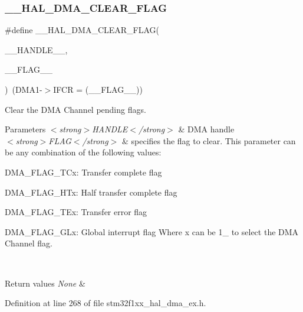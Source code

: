 \subsubsection{\texorpdfstring{\+\_\+\+\_\+\+H\+A\+L\+\_\+\+D\+M\+A\+\_\+\+C\+L\+E\+A\+R\+\_\+\+F\+L\+AG}{\_\_HAL\_DMA\_CLEAR\_FLAG}}
{\footnotesize\ttfamily \#define \+\_\+\+\_\+\+H\+A\+L\+\_\+\+D\+M\+A\+\_\+\+C\+L\+E\+A\+R\+\_\+\+F\+L\+AG(\begin{DoxyParamCaption}\item[{}]{\+\_\+\+\_\+\+H\+A\+N\+D\+L\+E\+\_\+\+\_\+,  }\item[{}]{\+\_\+\+\_\+\+F\+L\+A\+G\+\_\+\+\_\+ }\end{DoxyParamCaption})~(D\+M\+A1-\/$>$I\+F\+CR = (\+\_\+\+\_\+\+F\+L\+A\+G\+\_\+\+\_\+))}



Clear the D\+MA Channel pending flags. 


\begin{DoxyParams}{Parameters}
{\em $<$strong$>$\+H\+A\+N\+D\+L\+E$<$/strong$>$} & D\+MA handle \\
\hline
{\em $<$strong$>$\+F\+L\+A\+G$<$/strong$>$} & specifies the flag to clear. This parameter can be any combination of the following values\+: \begin{DoxyItemize}
\item D\+M\+A\+\_\+\+F\+L\+A\+G\+\_\+\+T\+Cx\+: Transfer complete flag \item D\+M\+A\+\_\+\+F\+L\+A\+G\+\_\+\+H\+Tx\+: Half transfer complete flag \item D\+M\+A\+\_\+\+F\+L\+A\+G\+\_\+\+T\+Ex\+: Transfer error flag \item D\+M\+A\+\_\+\+F\+L\+A\+G\+\_\+\+G\+Lx\+: Global interrupt flag Where x can be 1\+\_ to select the D\+MA Channel flag. \end{DoxyItemize}
\\
\hline
\end{DoxyParams}

\begin{DoxyRetVals}{Return values}
{\em None} & \\
\hline
\end{DoxyRetVals}


Definition at line 268 of file stm32f1xx\+\_\+hal\+\_\+dma\+\_\+ex.\+h.

\mbox{\label{group___d_m_a___low__density___medium__density___product__devices_ga798d4b3b3fbd32b95540967bb35b35be}} 
